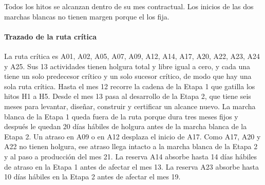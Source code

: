 Todos los hitos se alcanzan dentro de su mes contractual. Los inicios de las dos marchas blancas no
tienen margen porque el  los fija.

\paragraph{Trazado de la ruta crítica}
La ruta crítica es A01, A02, A05, A07, A09, A12, A14, A17, A20, A22, A23, A24 y A25. Sus 13
actividades tienen holgura total y libre igual a cero, y cada una tiene un solo predecesor crítico y un
solo sucesor crítico, de modo que hay una sola ruta crítica. Hasta el mes 12 recorre la cadena de la
Etapa 1 que gatilla los hitos H1 a H5. Desde el mes 13 pasa al desarrollo de la Etapa 2, que tiene seis
meses para levantar, diseñar, construir y certificar un alcance nuevo. La marcha blanca de la Etapa 1
queda fuera de la ruta porque dura tres meses fijos y después le quedan 20 días hábiles de holgura
antes de la marcha blanca de la Etapa 2. Un atraso en A09 o en A12 desplaza el inicio de A17. Como A17,
A20 y A22 no tienen holgura, ese atraso llega intacto a la marcha blanca de la Etapa 2 y al paso a
producción del mes 21. La reserva A14 absorbe hasta 14 días hábiles de atraso en la Etapa 1 antes de
afectar el mes 13. La reserva A23 absorbe hasta 10 días hábiles en la Etapa 2 antes de afectar el
mes 19.

